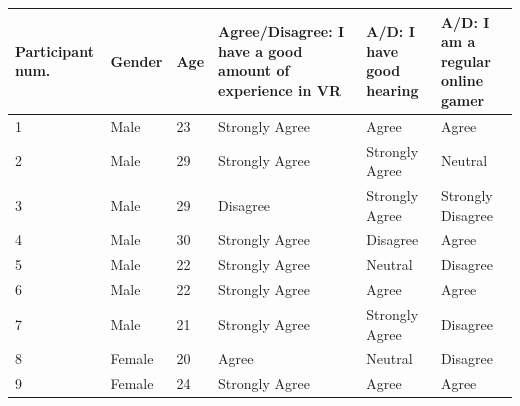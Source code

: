 \begin{appendices}
\begin{table}[]
	\begin{tabularx}{\linewidth}{|X|l|l|X|X|X|}
		\hline
		\textbf{Participant num.} & \textbf{Gender} & \textbf{Age} & \textbf{Agree/Disagree: I have a good amount of experience in VR} & \textbf{A/D: I have good hearing} & \textbf{A/D: I am a regular online gamer} \\ \hline
		1                       & Male            & 23           & Strongly Agree                                                    & Agree                             & Agree                                     \\ \hline
		2                       & Male            & 29           & Strongly Agree                                                    & Strongly Agree                    & Neutral                                   \\ \hline
		3                       & Male            & 29           & Disagree                                                          & Strongly Agree                    & Strongly Disagree                         \\ \hline
		4                       & Male            & 30           & Strongly Agree                                                    & Disagree                          & Agree                                     \\ \hline
		5                       & Male            & 22           & Strongly Agree                                                    & Neutral                           & Disagree                                  \\ \hline
		6                       & Male            & 22           & Strongly Agree                                                    & Agree                             & Agree                                     \\ \hline
		7                       & Male            & 21           & Strongly Agree                                                    & Strongly Agree                    & Disagree                                  \\ \hline
		8                       & Female          & 20           & Agree                                                             & Neutral                           & Disagree                                  \\ \hline
		9                       & Female          & 24           & Strongly Agree                                                    & Agree                             & Agree                                     \\ \hline

\end{tabularx}
\end{table}
\end{appendices}
